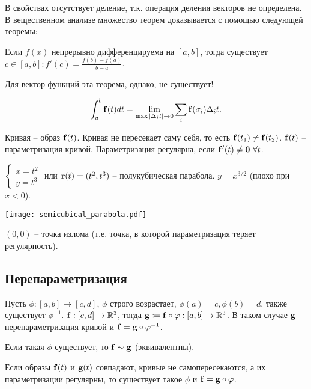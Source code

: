 \documentclass[main]{subfiles}
\begin{document}
В свойствах отсутствует деление, т.к. операция деления векторов не определена.
В вещественном анализе множество теорем доказывается с помощью следующей теоремы:
\begin{theorem*}[Лагранжа]
    Если $f(x)$ непрерывно дифференцируема на $[a,b]$, тогда существует $c \in [a,b] : f'(c) = \frac{f(b) - f(a)}{b-a}$.
\end{theorem*}
Для вектор-функций эта теорема, однако, не существует!


\begin{definition}
    \[\int_a^b \mathbf{f}(t) dt = \lim_{\max |\Delta_i t| \to 0} \sum_i \mathbf{f}(\sigma_i) \Delta_i t.\]
\end{definition}
\begin{definition}[Кривая]
    Кривая -- образ $\mathbf{f}(t)$.
    Кривая не пересекает саму себя, то есть $\mathbf{f}(t_1) \neq \mathbf{f}(t_2)$.
    $\mathbf{f}(t)$ -- параметризация кривой.
    Параметризация регулярна, если $\mathbf{f}'(t) \neq \mathbf{0}\ \forall t$.
\end{definition}
\begin{example}
    $\displaystyle \begin{cases}
            x = t^2 \\
            y = t^3
        \end{cases}$ или $\mathbf{r}(t) = (t^2, t^3)$ --
    полукубическая парабола. $y = x^{3/2}$ (плохо при $x<0$).
    \begin{center}
        \texttt{[image: semicubical\_parabola.pdf]}
    \end{center}

    $(0,0)$ -- точка излома (т.е. точка, в которой параметризация теряет регулярность).
\end{example}

\subsection{Перепараметризация}
Пусть $\phi: [a,b] \to [c,d]$, $\phi$ строго возрастает, $\phi(a) = c, \phi(b) = d$, также существует $\phi^{-1}$.
$\mathbf{f}: [c,d] \to \mathbb{R}^3$, тогда $\mathbf{g} \coloneqq \mathbf{f} \circ \varphi: [a,b] \to \mathbb{R}^3$.
В таком случае $\mathbf{g}$ -- перепараметризация кривой и $\mathbf{f} = \mathbf{g} \circ \varphi^{-1}$.

Если такая $\phi$ существует, то $\mathbf{f} \sim \mathbf{g}$ (эквивалентны).

Если образы $\mathbf{f}(t)$ и $\mathbf{g}(t)$ совпадают, кривые не самопересекаются,
а их параметризации регулярны, то существует такое $\phi$ и $\mathbf{f} = \mathbf{g} \circ \varphi$.
\end{document}
